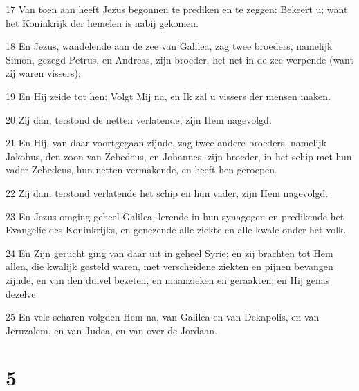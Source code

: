 \par 17 Van toen aan heeft Jezus begonnen te prediken en te zeggen: Bekeert u; want het Koninkrijk der hemelen is nabij gekomen.
\par 18 En Jezus, wandelende aan de zee van Galilea, zag twee broeders, namelijk Simon, gezegd Petrus, en Andreas, zijn broeder, het net in de zee werpende (want zij waren vissers);
\par 19 En Hij zeide tot hen: Volgt Mij na, en Ik zal u vissers der mensen maken.
\par 20 Zij dan, terstond de netten verlatende, zijn Hem nagevolgd.
\par 21 En Hij, van daar voortgegaan zijnde, zag twee andere broeders, namelijk Jakobus, den zoon van Zebedeus, en Johannes, zijn broeder, in het schip met hun vader Zebedeus, hun netten vermakende, en heeft hen geroepen.
\par 22 Zij dan, terstond verlatende het schip en hun vader, zijn Hem nagevolgd.
\par 23 En Jezus omging geheel Galilea, lerende in hun synagogen en predikende het Evangelie des Koninkrijks, en genezende alle ziekte en alle kwale onder het volk.
\par 24 En Zijn gerucht ging van daar uit in geheel Syrie; en zij brachten tot Hem allen, die kwalijk gesteld waren, met verscheidene ziekten en pijnen bevangen zijnde, en van den duivel bezeten, en maanzieken en geraakten; en Hij genas dezelve.
\par 25 En vele scharen volgden Hem na, van Galilea en van Dekapolis, en van Jeruzalem, en van Judea, en van over de Jordaan.

\chapter{5}


